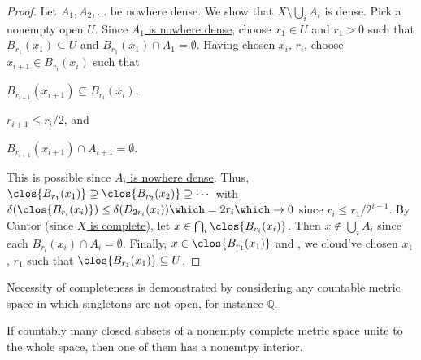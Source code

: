	\begin{proof}
		Let $A_1, A_2, \ldots$ be nowhere dense. We show that $X\setminus \bigcup_i A_i$ is dense. Pick a nonempty open $U$. Since \ul{$A_1$ is nowhere dense}, choose $x_1\in U$ and $r_1 > 0$ such that $B_{r_1}(x_1)\subseteq U$ and $B_{r_1}(x_1)\cap A_1 = \emptyset$. Having chosen
		$x_i$, $r_i$, choose $x_{i + 1}\in B_{r_i}(x_i)$ such that
		\begin{assmplist}
			\item $B_{r_{i + 1}}(x_{i + 1})\subseteq B_{r_i}(x_i)$,
			\item $r_{i + 1}\le r_i/2$, and
			\item $B_{r_{i + 1}}(x_{i + 1})\cap A_{i + 1} = \emptyset$.
		\end{assmplist}
		This is possible since \ul{$A_i$ is nowhere dense}.
		Thus, $\clos{B_{r_1}(x_1)}\supseteq\clos{B_{r_2}(x_2)}\supseteq\cdots$ with $\delta(\clos{B_{r_i}(x_i)})\le\delta(D_{2r_i}(x_i)) \which = 2r_i\which\to 0$ since $r_i\le r_1/2^{i - 1}$. By Cantor (since \ul{$X$ is complete}), let $x\in\bigcap_i\clos{B_{r_i}(x_i)}$. Then $x\notin \bigcup_i A_i$ since each $B_{r_i}(x_i)\cap A_i = \emptyset$. Finally, $x\in \clos{B_{r_1}(x_1)}$ and \wlogg, we cloud've chosen $x_1$, $r_1$ such that $\clos{B_{r_1}(x_1)}\subseteq U$.
	\end{proof}
	
	\begin{rmk}
		Necessity of completeness is demonstrated by considering any countable metric space in which singletons are not open, for instance $\mathbb Q$.
	\end{rmk}
	
	\begin{cor}
		If countably many closed subsets of a nonempty complete metric space unite to the whole space, then one of them has a nonemtpy interior.
	\end{cor}